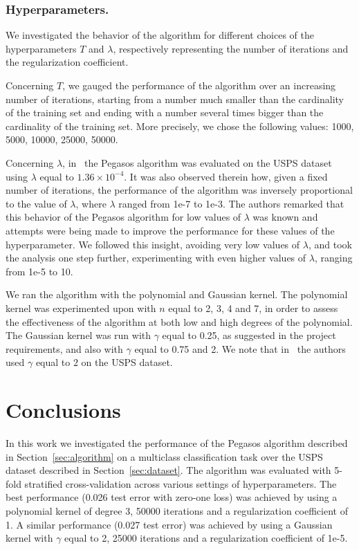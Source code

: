 \documentclass[runningheads]{llncs}
\begin{document}
\subsubsection{Hyperparameters.} We investigated the behavior of the algorithm for different choices of the hyperparameters $T$ and $\lambda$, respectively representing the number of iterations and the regularization coefficient.

Concerning $T$, we gauged the performance of the algorithm over an increasing number of iterations, starting from a number much smaller than the cardinality of the training set and ending with a number several times bigger than the cardinality of the training set. More precisely, we chose the following values: 1000, 5000, 10000, 25000, 50000.

Concerning $\lambda$, in~\cite{shalev-pegasos-2011} the Pegasos algorithm was evaluated on the USPS dataset using $\lambda$ equal to $1.36 \times 10^{-4}$. It was also observed therein how, given a fixed number of iterations, the performance of the algorithm was inversely proportional to the value of $\lambda$, where $\lambda$ ranged from 1e-7 to 1e-3. The authors remarked that this behavior of the Pegasos algorithm for low values of $\lambda$ was known and attempts were being made to improve the performance for these values of the hyperparameter. We followed this insight, avoiding very low values of $\lambda$, and took the analysis one step further, experimenting with even higher values of $\lambda$, ranging from 1e-5 to 10.

We ran the algorithm with the polynomial and Gaussian kernel. The polynomial kernel was experimented upon with $n$ equal to 2, 3, 4 and 7, in order to assess the effectiveness of the algorithm at both low and high degrees of the polynomial. The Gaussian kernel was run with $\gamma$ equal to 0.25, as suggested in the project requirements, and also with $\gamma$ equal to 0.75 and 2. We note that in~\cite{shalev-pegasos-2011} the authors used $\gamma$ equal to $2$ on the USPS dataset.

\section{Conclusions}
\label{sec:conclusions}

In this work we investigated the performance of the Pegasos algorithm described in Section~\ref{sec:algorithm} on a multiclass classification task over the USPS dataset described in Section~\ref{sec:dataset}. The algorithm was evaluated with 5-fold stratified cross-validation across various settings of hyperparameters. The best performance (0.026 test error with zero-one loss) was achieved by using a polynomial kernel of degree 3, 50000 iterations and a regularization coefficient of 1. A similar performance (0.027 test error) was achieved by using a Gaussian kernel with $\gamma$ equal to 2, 25000 iterations and a regularization coefficient of 1e-5.
\end{document}
